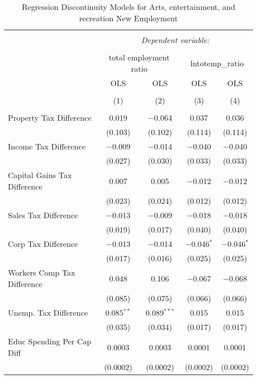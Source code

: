 
\begin{table}[!htbp] \centering 
  \caption{Regression Discontinuity Models for  Arts, entertainment, and recreation New Employment} 
  \label{71rd} 
\begin{tabular}{@{\extracolsep{5pt}}lcccc} 
\\[-1.8ex]\hline 
\hline \\[-1.8ex] 
 & \multicolumn{4}{c}{\textit{Dependent variable:}} \\ 
\cline{2-5} 
\\[-1.8ex] & \multicolumn{2}{c}{total employment ratio} & \multicolumn{2}{c}{lntotemp\_ratio} \\ 
 & OLS & OLS & OLS & OLS \\ 
\\[-1.8ex] & (1) & (2) & (3) & (4)\\ 
\hline \\[-1.8ex] 
 Property Tax Difference & 0.019 & $-$0.064 & 0.037 & 0.036 \\ 
  & (0.103) & (0.102) & (0.114) & (0.114) \\ 
  Income Tax Difference & $-$0.009 & $-$0.014 & $-$0.040 & $-$0.040 \\ 
  & (0.027) & (0.030) & (0.033) & (0.033) \\ 
  Capital Gains Tax Difference & 0.007 & 0.005 & $-$0.012 & $-$0.012 \\ 
  & (0.023) & (0.024) & (0.012) & (0.012) \\ 
  Sales Tax Difference & $-$0.013 & $-$0.009 & $-$0.018 & $-$0.018 \\ 
  & (0.019) & (0.017) & (0.040) & (0.040) \\ 
  Corp Tax Difference & $-$0.013 & $-$0.014 & $-$0.046$^{*}$ & $-$0.046$^{*}$ \\ 
  & (0.017) & (0.016) & (0.025) & (0.025) \\ 
  Workers Comp Tax Difference & 0.048 & 0.106 & $-$0.067 & $-$0.068 \\ 
  & (0.085) & (0.075) & (0.066) & (0.066) \\ 
  Unemp. Tax Difference & 0.085$^{**}$ & 0.089$^{***}$ & 0.015 & 0.015 \\ 
  & (0.035) & (0.034) & (0.017) & (0.017) \\ 
  Educ Spending Per Cap Diff & 0.0003 & 0.0003 & 0.0001 & 0.0001 \\ 
  & (0.0002) & (0.0002) & (0.0002) & (0.0002) \\ 

\end{tabular}
\end{table}
